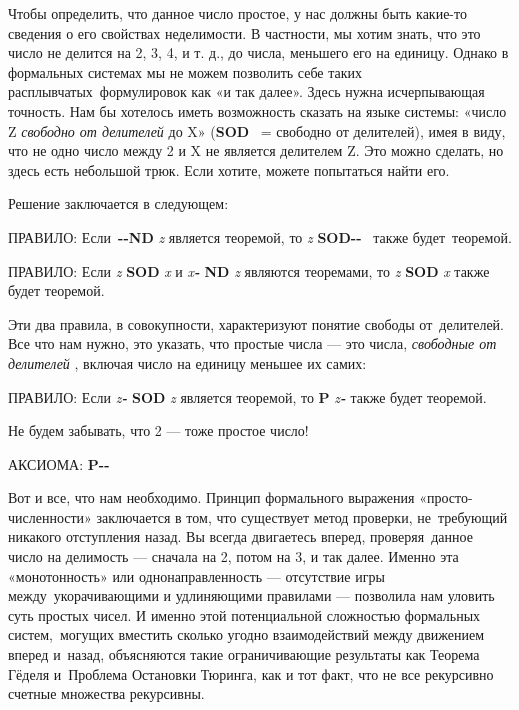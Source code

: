 Чтобы определить, что данное число простое, у нас должны быть какие-то сведения о его свойствах неделимости. В частности, мы хотим знать, что это число не делится на 2, 3, 4, и т. д., до числа, меньшего его на единицу. Однако в формальных системах мы не можем позволить себе таких расплывчатых~формулировок как «и так далее». Здесь нужна исчерпывающая точность. Нам бы хотелось иметь возможность сказать на языке системы: «число Z \emph{свободно от делителей} до X» (\textbf{SOD} ~= свободно от делителей), имея в виду, что не одно число между 2 и X не является делителем Z. Это можно сделать, но здесь есть небольшой трюк. Если хотите, можете попытаться найти его.

Решение заключается в следующем:

ПРАВИЛО: Если~\textbf{-\/-ND} \emph{z} является теоремой, то \emph{z} \textbf{SOD-\/-} ~также будет~теоремой.

ПРАВИЛО: Если \emph{z} \textbf{SOD} \emph{x} и \emph{x\textbf{-}} \textbf{ND} \emph{z} являются теоремами, то \emph{z} \textbf{SOD} \emph{x} также будет теоремой.

Эти два правила, в совокупности, характеризуют понятие свободы от~делителей. Все что нам нужно, это указать, что простые числа --- это числа, \emph{свободные от делителей} , включая число на единицу меньшее их самих:

ПРАВИЛО: Если \emph{z\textbf{-}} \textbf{SOD} \emph{z} является теоремой, то \textbf{P} \emph{z\textbf{-}} также будет теоремой.

Не будем забывать, что 2 --- тоже простое число!

АКСИОМА: \textbf{P-\/-}

Вот и все, что нам необходимо. Принцип формального выражения «просто-численности» заключается в том, что существует метод проверки, не~требующий никакого отступления назад. Вы всегда двигаетесь вперед, проверяя~данное число на делимость --- сначала на 2, потом на 3, и так далее. Именно эта «монотонность» или однонаправленность --- отсутствие игры между~укорачивающими и удлиняющими правилами --- позволила нам уловить суть простых чисел. И именно этой потенциальной сложностью формальных систем,~могущих вместить сколько угодно взаимодействий между движением вперед и~назад, объясняются такие ограничивающие результаты как Теорема Гёделя и~Проблема Остановки Тюринга, как и тот факт, что не все рекурсивно счетные множества рекурсивны.

